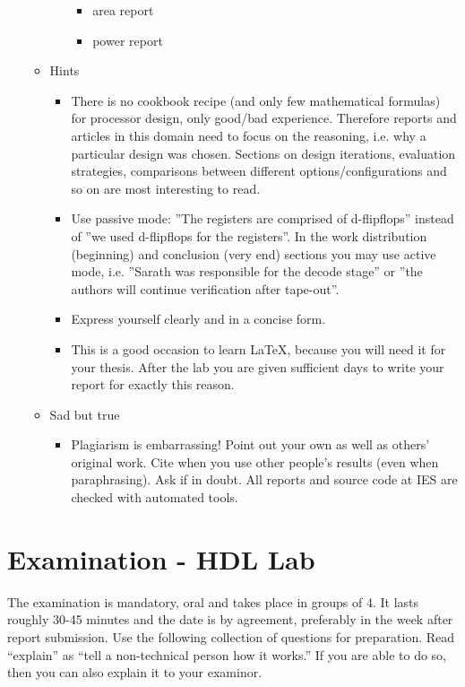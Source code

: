 \begin{enumerate}
\begin{itemize}
\begin{itemize}
\begin{itemize}
				\item area report
				\item power report
				\end{itemize}
			\end{itemize}
		\item Hints
			\begin{itemize}
			\item There is no cookbook recipe (and only few mathematical formulas) for processor design, only good/bad experience. Therefore reports and articles in this domain need to focus on the reasoning, i.e. why a particular design was chosen. Sections on design iterations, evaluation strategies, comparisons between different options/configurations and so on are most interesting to read. 
			\item Use passive mode: ''The registers are comprised of d-flipflops'' instead of  ''we used d-flipflops for the registers''. In the work distribution (beginning) and conclusion (very end) sections you may use active mode, i.e. ''Sarath was responsible for the decode stage'' or ''the authors will continue verification after tape-out''.
			\item Express yourself clearly and in a concise form.					
			\item This is a good occasion to learn \LaTeX, because you will need it for your thesis. After the lab you are given sufficient days to write your report for exactly this reason.
			\end{itemize}
		\item Sad but true
		\begin{itemize}
			\item Plagiarism is embarrassing! Point out your own as well as others' original work. Cite when you use other people's results (even when paraphrasing). Ask if in doubt. All reports and source code at IES are checked with automated tools.
			\end{itemize}
	\end{itemize}
\end{enumerate}

\newpage
\section{Examination - HDL Lab}
The examination is mandatory, oral and takes place in groups of 4. It lasts roughly 30-45 minutes and the date is by agreement, preferably in the week after report submission. Use the following collection of questions for preparation. Read ``explain'' as ``tell a non-technical person how it works.'' If you are able to do so, then you can also explain it to your examinor.

